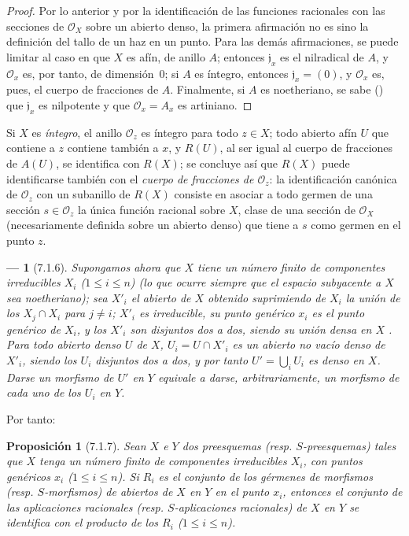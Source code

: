 \documentclass[oneside]{amsart}
\theoremstyle{ega-env-style}
\newtheorem*{env}{---}
\theoremstyle{ega-thm-env-style}
\newtheorem*{proposition}{Proposición}
\theoremstyle{ega-defn-env-style}
\def\leq{\leqslant}                 %
\newcommand{\oldpage}[2][]{{\marginnote{\normalfont{\textbf{#1}~|~#2}}}\ignorespaces}
\let\EGAOriginalLabel\label
\renewcommand{\label}[1]{\phantomsection\EGAOriginalLabel{#1}}
\begin{document}
\begin{proof}
Por lo anterior y por la identificación de las funciones racionales con las secciones de $\mathscr{O}_X$ sobre un abierto denso, la primera afirmación no es sino la definición del tallo de un haz en un punto.
Para las demás afirmaciones, se puede limitar al caso en que $X$ es afín, de anillo $A$; entonces $\mathfrak{j}_x$ es el nilradical de $A$, y $\mathscr{O}_x$ es, por tanto, de dimensión~0; si $A$ es íntegro, entonces $\mathfrak{j}_x=(0)$, y $\mathscr{O}_x$ es, pues, el cuerpo de fracciones de $A$.
Finalmente, si $A$ es noetheriano, se sabe (\cite[p.~127, cor.~4]{I-11}) que $\mathfrak{j}_x$ es nilpotente y que $\mathscr{O}_x=A_x$ es artiniano.
\end{proof}

Si $X$ es \emph{íntegro}, el anillo $\mathscr{O}_z$ es íntegro para todo $z\in X$; todo abierto afín $U$ que contiene a $z$ contiene también a $x$, y $R(U)$, al ser igual al cuerpo de fracciones de $A(U)$, se identifica con $R(X)$; se concluye así que $R(X)$ puede identificarse también con el \emph{cuerpo de fracciones de $\mathscr{O}_z$}: la identificación canónica de $\mathscr{O}_z$ con un subanillo de $R(X)$ consiste en asociar a todo germen de una sección $s\in\mathscr{O}_z$ la única función racional sobre $X$, clase de una sección de $\mathscr{O}_X$ (necesariamente definida sobre un abierto denso) que tiene a $s$ como germen en el punto $z$.

\begin{env}[7.1.6]
\label{I.7.1.6}
Supongamos ahora que $X$ tiene un número \emph{finito} de componentes irreducibles $X_i$ ($1\leq i\leq n$) (lo que ocurre siempre que el espacio subyacente a $X$ sea \emph{noetheriano}); sea $X'_i$ el abierto de $X$ obtenido suprimiendo de $X_i$ la unión de los $X_j\cap X_i$ para $j\neq i$; $X'_i$ es irreducible, su punto genérico $x_i$ es el punto genérico de $X_i$, y los $X'_i$ son disjuntos dos a dos, siendo su unión densa en $X$ .
Para
\oldpage[I]{157}
todo abierto denso $U$ de $X$, $U_i=U\cap X'_i$ es un abierto no vacío denso de $X'_i$, siendo los $U_i$ disjuntos dos a dos, y por tanto $U'=\bigcup_i U_i$ es denso en $X$.
Darse un morfismo de $U'$ en $Y$ equivale a darse, arbitrariamente, un morfismo de cada uno de los $U_i$ en $Y$.
\end{env}

Por tanto:
\begin{proposition}[7.1.7]
\label{I.7.1.7}
Sean $X$ e $Y$ dos preesquemas (\textup{resp.} $S$-preesquemas) tales que $X$ tenga un número finito de componentes irreducibles $X_i$, con puntos genéricos $x_i$ ($1\leq i\leq n$).
Si $R_i$ es el conjunto de los gérmenes de morfismos (\textup{resp.} $S$-morfismos) de abiertos de $X$ en $Y$ en el punto $x_i$, entonces el conjunto de las aplicaciones racionales (\textup{resp.} $S$-aplicaciones racionales) de $X$ en $Y$ se identifica con el producto de los $R_i$ ($1\leq i\leq n$).
\end{proposition}
\end{document}
